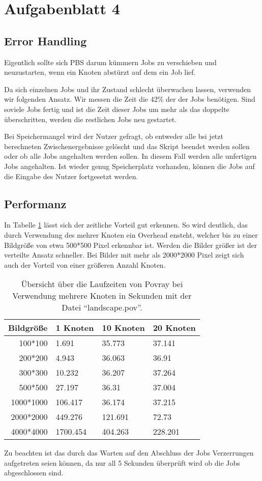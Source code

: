 \section{Aufgabenblatt 4}

\subsection{Error Handling}
	Eigentlich sollte sich PBS darum kümmern Jobs zu verschieben und 
	neuzustarten, wenn ein Knoten abstürzt auf dem ein Job lief.

	Da sich einzelnen Jobs und ihr Zustand schlecht überwachen lassen,
	verwenden wir folgenden Ansatz.
	Wir messen die Zeit die 42\% der der Jobs benötigen.
	Sind soviele Jobs fertig und ist die Zeit dieser Jobs um mehr als das
	doppelte überschritten, werden die restlichen Jobs neu gestartet.

	Bei Speichermangel wird der Nutzer gefragt,
	ob entweder alle bsi jetzt berechneten Zwischenergebnisse gelöscht und
	das Skript beendet werden sollen oder ob alle Jobs angehalten werden sollen.
	In diesem Fall werden alle unfertigen Jobs angehalten.
	Ist wieder genug Speicherplatz vorhanden,
	können die Jobs auf die Eingabe des Nutzer fortgesetzt werden.


\subsection{Performanz}

		In Tabelle \ref{tab:povrayperformance} lässt sich der zeitliche Vorteil	gut erkennen. 
		So wird deutlich, das durch Verwendung des mehrer Knoten ein Overhead ensteht,
		welcher bis zu einer Bildgröße von etwa 500*500 Pixel erkennbar ist.
		Werden die Bilder größer ist der verteilte Ansatz schneller.
		Bei Bilder mit mehr als 2000*2000 Pixel zeigt sich auch der Vorteil von einer größeren Anzahl Knoten.
	
		\begin{table}[h]
		\begin{center}
		\begin{tabular}{r l l l} 
			\toprule
			Bildgröße	&	1 Knoten		&	10 Knoten	&	20 Knoten	\\
			\midrule
			100*100		&	1.691		&	35.773	&	37.141	\\
			200*200		&	4.943		&	36.063	&	36.91	\\
			300*300		&	10.232	&	36.207	&	37.264	\\
			500*500		&	27.197	&	36.31		&	37.004	\\
			1000*1000	&	106.417	&	36.174	&	37.215	\\
			2000*2000	&	449.276	&	121.691	&	72.73	\\
			4000*4000	&	1700.454	&	404.263	&	228.201	\\
			\bottomrule
		\end{tabular}
		\caption{Übersicht über die Laufzeiten von Povray bei Verwendung mehrere Knoten in Sekunden mit der Datei ``landscape.pov''.}
		\label{tab:povrayperformance}
		\end{center}
		\end{table}
	
		Zu beachten ist das durch das Warten auf den Abschluss der Jobs Verzerrungen aufgetreten seien können,
		da nur all 5 Sekunden überprüft wird ob die Jobs abgeschlossen sind.
	
